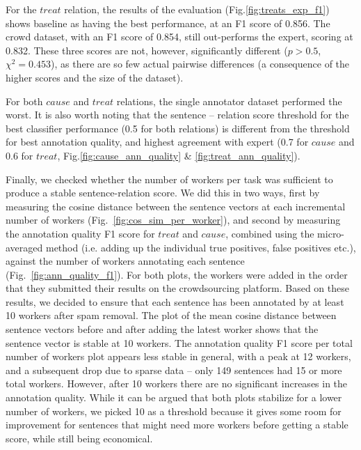 For the $treat$ relation, the results of the evaluation (Fig.\ref{fig:treats_exp_f1}) shows baseline as having the best performance, at an F1 score of 0.856. The crowd dataset, with an F1 score of 0.854, still out-performs the expert, scoring at 0.832.  These three scores are not, however, significantly different ($p > 0.5$, $ \chi^2 = 0.453 $), as there are so few actual pairwise differences (a consequence of the higher scores and the size of the dataset). 

For both $cause$ and $treat$ relations, the single annotator dataset performed the worst. It is also worth noting that the sentence -- relation score threshold for the best classifier performance (0.5 for both relations) is different from the threshold for best annotation quality, and highest agreement with expert (0.7 for $cause$ and 0.6 for $treat$, Fig.\ref{fig:cause_ann_quality} \& \ref{fig:treat_ann_quality}).

Finally, we checked whether the number of workers per task was sufficient to produce a stable sentence-relation score. We did this in two ways, first by measuring the cosine distance between the sentence vectors at each incremental number of workers (Fig.~\ref{fig:cos_sim_per_worker}), and second by measuring the annotation quality F1 score for $treat$ and $cause$, combined using the micro-averaged method (i.e. adding up the individual true positives, false positives etc.), against the number of workers annotating each sentence (Fig.~\ref{fig:ann_quality_f1}). For both plots, the workers were added in the order that they submitted their results on the crowdsourcing platform.  Based on these results, we decided to ensure that each sentence has been annotated by at least 10 workers after spam removal.  The plot of the mean cosine distance between sentence vectors before and after adding the latest worker shows that the sentence vector is stable at 10 workers. The annotation quality F1 score per total number of workers plot appears less stable in general, with a peak at 12 workers, and a subsequent drop due to sparse data -- only 149 sentences had 15 or more total workers. However, after 10 workers there are no significant increases in the annotation quality.  While it can be argued that both plots stabilize for a lower number of workers, we picked 10 as a threshold because it gives some room for improvement for sentences that might need more workers before getting a stable score, while still being economical.

